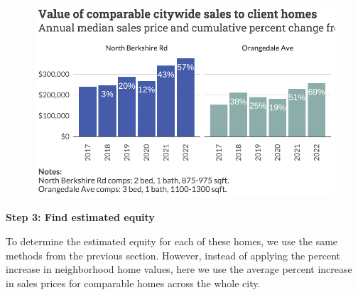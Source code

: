 \documentclass[
  letterpaper,
  DIV=11,
  numbers=noendperiod]{scrartcl}
\begin{document}
\begin{figure}[H]

{\centering \includegraphics{piedmont_files/figure-pdf/equity-sales-plot-1.pdf}

}

\end{figure}

\textbf{Step 3: Find estimated equity}

To determine the estimated equity for each of these homes, we use the
same methods from the previous section. However, instead of applying the
percent increase in neighborhood home values, here we use the average
percent increase in sales prices for comparable homes across the whole
city.
\end{document}
